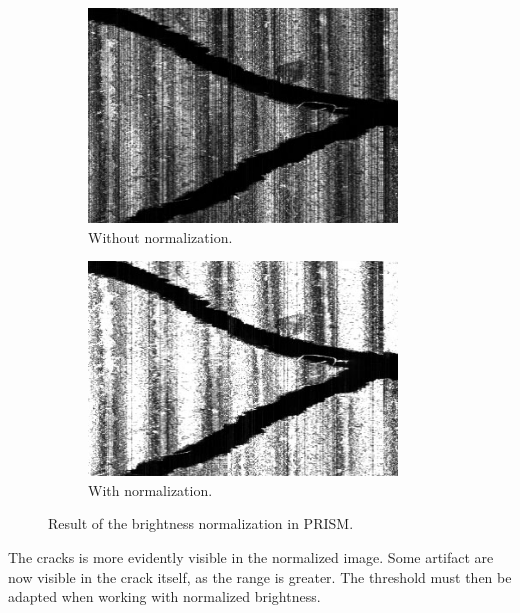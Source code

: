 \begin{figure}[!ht]
\centering
    \begin{subfigure}[t]{0.45\textwidth}
    \centering
    \includegraphics[width=0.9\textwidth]{images/bri-norm-before}
    \caption{Without normalization.}
    \label{fig:brinormbef}
    \end{subfigure}
    \begin{subfigure}[t]{0.45\textwidth}
    \centering
    \includegraphics[width=0.9\textwidth]{images/bri-norm-after}
    \caption{With normalization.}
    \label{fig:brinormaft}
    \end{subfigure}
    \caption{Result of the brightness normalization in PRISM.}
    \label{fig:brinorm}
\end{figure}

The cracks is more evidently visible in the normalized image. Some artifact are now visible in the crack itself, as the range is greater. The threshold must then be adapted when working with normalized brightness.

